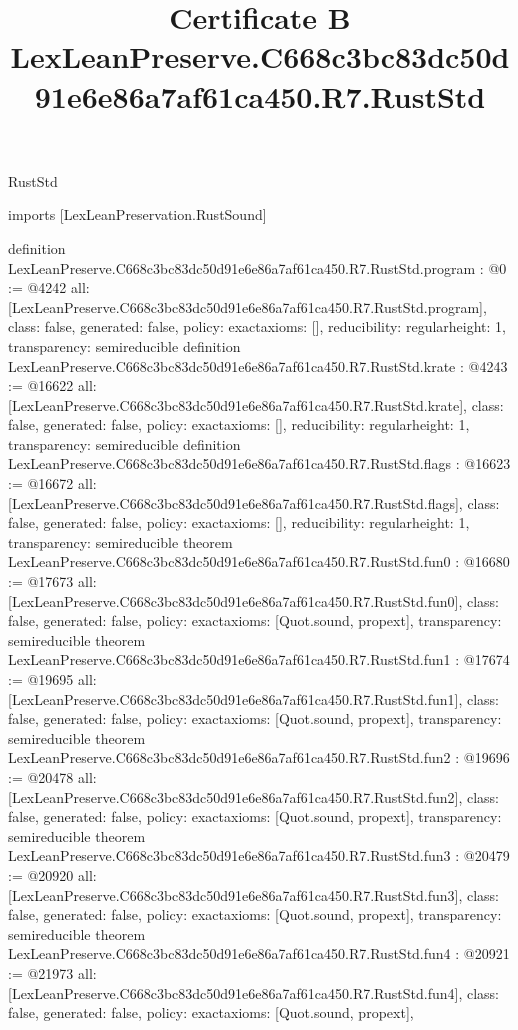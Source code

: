 \begin{lexlean}{RustStd}
\title{Certificate B LexLeanPreserve.C668c3bc83dc50d91e6e86a7af61ca450.R7.RustStd}
\begin{coremodule}
imports [LexLeanPreservation.RustSound]

definition LexLeanPreserve.C668c3bc83dc50d91e6e86a7af61ca450.R7.RustStd.program : @0 := @4242 {
  all: [LexLeanPreserve.C668c3bc83dc50d91e6e86a7af61ca450.R7.RustStd.program],
  class: false,
  generated: false,
  policy: exact{axioms: []},
  reducibility: regular{height: 1},
  transparency: semireducible
}
definition LexLeanPreserve.C668c3bc83dc50d91e6e86a7af61ca450.R7.RustStd.krate : @4243 := @16622 {
  all: [LexLeanPreserve.C668c3bc83dc50d91e6e86a7af61ca450.R7.RustStd.krate],
  class: false,
  generated: false,
  policy: exact{axioms: []},
  reducibility: regular{height: 1},
  transparency: semireducible
}
definition LexLeanPreserve.C668c3bc83dc50d91e6e86a7af61ca450.R7.RustStd.flags : @16623 := @16672 {
  all: [LexLeanPreserve.C668c3bc83dc50d91e6e86a7af61ca450.R7.RustStd.flags],
  class: false,
  generated: false,
  policy: exact{axioms: []},
  reducibility: regular{height: 1},
  transparency: semireducible
}
theorem LexLeanPreserve.C668c3bc83dc50d91e6e86a7af61ca450.R7.RustStd.fun0 : @16680 := @17673 {
  all: [LexLeanPreserve.C668c3bc83dc50d91e6e86a7af61ca450.R7.RustStd.fun0],
  class: false,
  generated: false,
  policy: exact{axioms: [Quot.sound, propext]},
  transparency: semireducible
}
theorem LexLeanPreserve.C668c3bc83dc50d91e6e86a7af61ca450.R7.RustStd.fun1 : @17674 := @19695 {
  all: [LexLeanPreserve.C668c3bc83dc50d91e6e86a7af61ca450.R7.RustStd.fun1],
  class: false,
  generated: false,
  policy: exact{axioms: [Quot.sound, propext]},
  transparency: semireducible
}
theorem LexLeanPreserve.C668c3bc83dc50d91e6e86a7af61ca450.R7.RustStd.fun2 : @19696 := @20478 {
  all: [LexLeanPreserve.C668c3bc83dc50d91e6e86a7af61ca450.R7.RustStd.fun2],
  class: false,
  generated: false,
  policy: exact{axioms: [Quot.sound, propext]},
  transparency: semireducible
}
theorem LexLeanPreserve.C668c3bc83dc50d91e6e86a7af61ca450.R7.RustStd.fun3 : @20479 := @20920 {
  all: [LexLeanPreserve.C668c3bc83dc50d91e6e86a7af61ca450.R7.RustStd.fun3],
  class: false,
  generated: false,
  policy: exact{axioms: [Quot.sound, propext]},
  transparency: semireducible
}
theorem LexLeanPreserve.C668c3bc83dc50d91e6e86a7af61ca450.R7.RustStd.fun4 : @20921 := @21973 {
  all: [LexLeanPreserve.C668c3bc83dc50d91e6e86a7af61ca450.R7.RustStd.fun4],
  class: false,
  generated: false,
  policy: exact{axioms: [Quot.sound, propext]},
}
\end{coremodule}
\end{lexlean}
